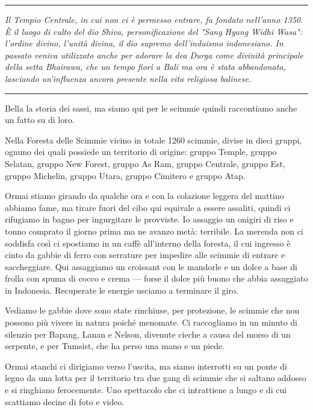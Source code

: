 \begin{center}
    \noindent\rule{0.6\textwidth}{0.4pt}
\end{center}

\textit{Il Tempio Centrale, in cui non ci è permesso entrare, fu fondato nell'anno 1350. È il luogo di culto del dio Shiva, personificazione del "Sang Hyang Widhi Wasa": l'ordine divino, l'unità divina, il dio supremo dell'induismo indonesiano. In passato veniva utilizzato anche per adorare la dea Durga come divinità principale della setta Bhairawa, che un tempo fiorì a Bali ma ora è stata abbandonata, lasciando un'influenza ancora presente nella vita religiosa balinese.}

\begin{center}
    \noindent\rule{0.6\textwidth}{0.4pt}
\end{center}

Bella la storia dei sassi, ma siamo qui per le scimmie quindi raccontiamo anche un fatto su di loro. 

Nella Foresta delle Scimmie vicino in totale 1260 scimmie, divise in dieci gruppi, ognuno dei quali possiede un territorio di origine: gruppo Temple, gruppo Selatan, gruppo New Forest, gruppo As Ram, gruppo Centrale, gruppo Est, gruppo Michelin, gruppo Utara, gruppo Cimitero e gruppo Atap.

Ormai stiamo girando da qualche ora e con la colazione leggera del mattino abbiamo fame, ma tirare fuori del cibo qui equivale a essere assaliti, quindi ci rifugiamo in bagno per ingurgitare le provviste. Io assaggio un onigiri di riso e tonno comprato il giorno prima ma ne avanzo metà: terribile. La merenda non ci soddisfa così ci spostiamo in un caffè all'interno della foresta, il cui ingresso è cinto da gabbie di ferro con serrature per impedire alle scimmie di entrare e saccheggiare. Qui assaggiamo un croissant con le mandorle e un dolce a base di frolla con spuma di cocco e crema — forse il dolce più buono che abbia assaggiato in Indonesia. Recuperate le energie usciamo a terminare il giro.

Vediamo le gabbie dove sono state rinchiuse, per protezione, le scimmie che non possono più vivere in natura poiché menomate. Ci raccogliamo in un minuto di silenzio per Bapang, Lanan e Nelson, divenute cieche a causa del morso di un serpente, e per Tumsist, che ha perso una mano e un piede.

Ormai stanchi ci dirigiamo verso l'uscita, ma siamo interrotti su un ponte di legno da una lotta per il territorio tra due gang di scimmie che si saltano addosso e si ringhiano ferocemente. Uno spettacolo che ci intrattiene a lungo e di cui scattiamo decine di foto e video.

